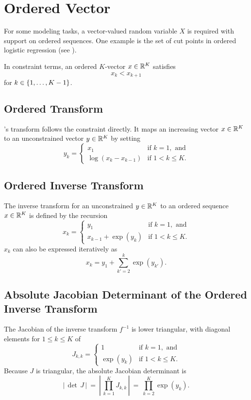 \section{Ordered Vector}

For some modeling tasks, a vector-valued random variable $X$ is
required with support on ordered sequences.  One example is the set of
cut points in ordered logistic regression (see ).

In constraint terms, an ordered $K$-vector $x \in \mathbb{R}^K$ satisfies
\[
x_k < x_{k+1}
\]
%
for $k \in \{ 1,\ldots,K-1 \}$.


\subsection{Ordered Transform}

\Stan's transform follows the constraint directly.  It maps an
increasing vector $x \in \mathbb{R}^{K}$ to an unconstrained vector $y \in
\mathbb{R}^K$ by setting
%
\[
y_k
= 
\left\{
\begin{array}{ll}
x_1 & \mbox{if } k = 1, \mbox{ and}
\\[4pt]
\log \left( x_{k} - x_{k-1} \right) & \mbox{if } 1 < k \leq K.
\end{array}
\right.
\] 

\subsection{Ordered Inverse Transform}

The inverse transform for an unconstrained $y \in \mathbb{R}^K$ to an
ordered sequence $x \in \mathbb{R}^K$ is defined by the recursion
%
\[
x_k
= 
\left\{
\begin{array}{ll} 
y_1 & \mbox{if } k = 1, \mbox{ and}
\\[4pt]
x_{k-1} + \exp(y_k) & \mbox{if } 1 < k \leq K.
\end{array}
\right.
\]
%
$x_k$ can also be expressed iteratively as
\[
x_k = y_1 + \sum_{k'=2}^k \exp(y_{k'}).
\]

\subsection{Absolute Jacobian Determinant of the Ordered
  Inverse Transform}

The Jacobian of the inverse transform $f^{-1}$ is lower triangular,
with diagonal elements for $1 \leq k \leq K$ of
\[
J_{k,k} = 
\left\{
\begin{array}{ll} 
1 & \mbox{if } k = 1, \mbox{ and}
\\[4pt]
\exp(y_k) & \mbox{if } 1 < k \leq K.
\end{array}
\right.
\]
%
Because $J$ is triangular, the absolute Jacobian determinant is
%
\[
\left| \, \det \, J \, \right|
\ = \ 
\left| \, \prod_{k=1}^K J_{k,k} \, \right|
\ = \ 
\prod_{k=2}^K \exp(y_k).
\]

